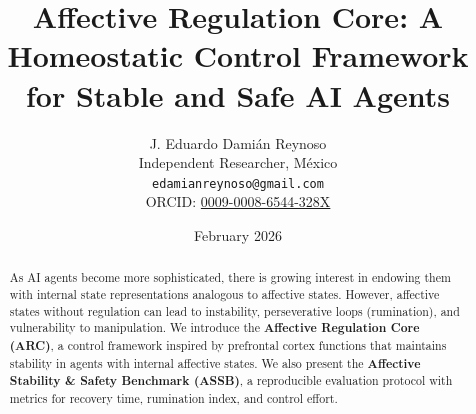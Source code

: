 \documentclass{article}
\title{Affective Regulation Core: A Homeostatic Control Framework for Stable and Safe AI Agents}
\author{
  J. Eduardo {Dami\'{a}n Reynoso} \\
  Independent Researcher, M\'{e}xico \\
  \texttt{edamianreynoso@gmail.com} \\
  ORCID: \href{https://orcid.org/0009-0008-6544-328X}{0009-0008-6544-328X}
}
\date{February 2026}
\begin{document}
\maketitle

\begin{abstract}
As AI agents become more sophisticated, there is growing interest in endowing them with internal state representations analogous to affective states. However, affective states without regulation can lead to instability, perseverative loops (rumination), and vulnerability to manipulation. We introduce the \textbf{Affective Regulation Core (ARC)}, a control framework inspired by prefrontal cortex functions that maintains stability in agents with internal affective states. We also present the \textbf{Affective Stability \& Safety Benchmark (ASSB)}, a reproducible evaluation protocol with metrics for recovery time, rumination index, and control effort.


\end{abstract}
\end{document}
